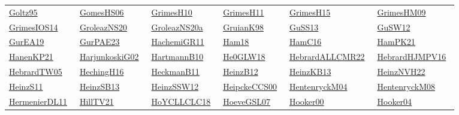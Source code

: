 \begin{longtable}{*{6}{l}}
\href{works/Goltz95.pdf}{Goltz95}~\cite{Goltz95} & \href{works/GomesHS06.pdf}{GomesHS06}~\cite{GomesHS06} & \href{works/GrimesH10.pdf}{GrimesH10}~\cite{GrimesH10} & \href{works/GrimesH11.pdf}{GrimesH11}~\cite{GrimesH11} & \href{}{GrimesH15}~\cite{GrimesH15} & \href{works/GrimesHM09.pdf}{GrimesHM09}~\cite{GrimesHM09}\\ 
\href{works/GrimesIOS14.pdf}{GrimesIOS14}~\cite{GrimesIOS14} & \href{works/GroleazNS20.pdf}{GroleazNS20}~\cite{GroleazNS20} & \href{works/GroleazNS20a.pdf}{GroleazNS20a}~\cite{GroleazNS20a} & \href{works/GruianK98.pdf}{GruianK98}~\cite{GruianK98} & \href{works/GuSS13.pdf}{GuSS13}~\cite{GuSS13} & \href{works/GuSW12.pdf}{GuSW12}~\cite{GuSW12}\\ 
\href{works/GurEA19.pdf}{GurEA19}~\cite{GurEA19} & \href{works/GurPAE23.pdf}{GurPAE23}~\cite{GurPAE23} & \href{works/HachemiGR11.pdf}{HachemiGR11}~\cite{HachemiGR11} & \href{works/Ham18.pdf}{Ham18}~\cite{Ham18} & \href{}{HamC16}~\cite{HamC16} & \href{works/HamPK21.pdf}{HamPK21}~\cite{HamPK21}\\ 
\href{works/HanenKP21.pdf}{HanenKP21}~\cite{HanenKP21} & \href{}{HarjunkoskiG02}~\cite{HarjunkoskiG02} & \href{}{HartmannB10}~\cite{HartmannB10} & \href{works/He0GLW18.pdf}{He0GLW18}~\cite{He0GLW18} & \href{works/HebrardALLCMR22.pdf}{HebrardALLCMR22}~\cite{HebrardALLCMR22} & \href{works/HebrardHJMPV16.pdf}{HebrardHJMPV16}~\cite{HebrardHJMPV16}\\ 
\href{works/HebrardTW05.pdf}{HebrardTW05}~\cite{HebrardTW05} & \href{works/HechingH16.pdf}{HechingH16}~\cite{HechingH16} & \href{works/HeckmanB11.pdf}{HeckmanB11}~\cite{HeckmanB11} & \href{works/HeinzB12.pdf}{HeinzB12}~\cite{HeinzB12} & \href{works/HeinzKB13.pdf}{HeinzKB13}~\cite{HeinzKB13} & \href{works/HeinzNVH22.pdf}{HeinzNVH22}~\cite{HeinzNVH22}\\ 
\href{works/HeinzS11.pdf}{HeinzS11}~\cite{HeinzS11} & \href{works/HeinzSB13.pdf}{HeinzSB13}~\cite{HeinzSB13} & \href{works/HeinzSSW12.pdf}{HeinzSSW12}~\cite{HeinzSSW12} & \href{works/HeipckeCCS00.pdf}{HeipckeCCS00}~\cite{HeipckeCCS00} & \href{works/HentenryckM04.pdf}{HentenryckM04}~\cite{HentenryckM04} & \href{works/HentenryckM08.pdf}{HentenryckM08}~\cite{HentenryckM08}\\ 
\href{works/HermenierDL11.pdf}{HermenierDL11}~\cite{HermenierDL11} & \href{works/HillTV21.pdf}{HillTV21}~\cite{HillTV21} & \href{works/HoYCLLCLC18.pdf}{HoYCLLCLC18}~\cite{HoYCLLCLC18} & \href{works/HoeveGSL07.pdf}{HoeveGSL07}~\cite{HoeveGSL07} & \href{}{Hooker00}~\cite{Hooker00} & \href{works/Hooker04.pdf}{Hooker04}~\cite{Hooker04}\\ 

\end{longtable}
